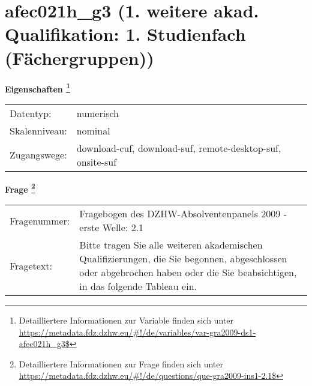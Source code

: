 
    \setcounter{footnote}{0}

    \vspace*{-1.8cm}
	\section{afec021h\_g3 (1. weitere akad. Qualifikation: 1. Studienfach (Fächergruppen))}
	\label{section:afec021h_g3}



    \vspace*{0.5cm}
    \noindent\textbf{Eigenschaften
	\footnote{Detailliertere Informationen zur Variable finden sich unter
		\url{https://metadata.fdz.dzhw.eu/\#!/de/variables/var-gra2009-ds1-afec021h_g3$}}}\\
	\begin{tabularx}{\hsize}{@{}lX}
	Datentyp: & numerisch \\
	Skalenniveau: & nominal \\
	Zugangswege: &
	  download-cuf, 
	  download-suf, 
	  remote-desktop-suf, 
	  onsite-suf
 \\
    \end{tabularx}



				\vspace*{0.5cm}
                \noindent\textbf{Frage
	                \footnote{Detailliertere Informationen zur Frage finden sich unter
		              \url{https://metadata.fdz.dzhw.eu/\#!/de/questions/que-gra2009-ins1-2.1$}}}\\
				\begin{tabularx}{\hsize}{@{}lX}
					Fragenummer: &
					  Fragebogen des DZHW-Absolventenpanels 2009 - erste Welle:
					  2.1
 \\
					Fragetext: & Bitte tragen Sie alle weiteren akademischen Qualifizierungen, die Sie begonnen, abgeschlossen oder abgebrochen haben oder die Sie beabsichtigen, in das folgende Tableau ein. \\
				\end{tabularx}





